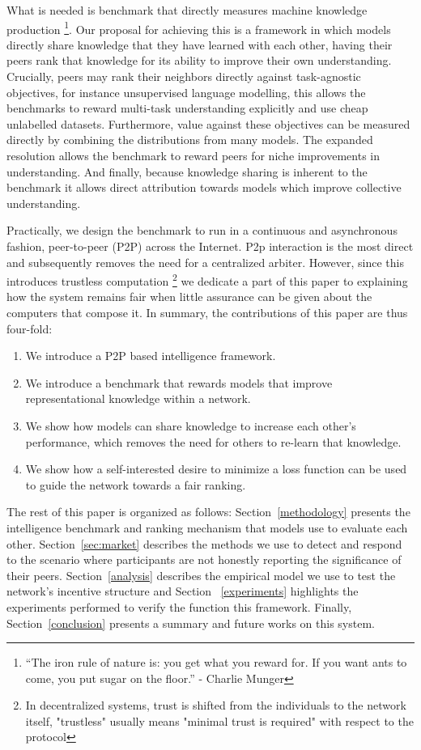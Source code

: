 \documentclass{article}
\begin{document}
What is needed is benchmark that directly measures machine knowledge production \footnote{“The iron rule of nature is: you get what you reward for. If you want ants to come, you put sugar on the floor.” - Charlie Munger}. Our proposal for achieving this is a framework in which models directly share knowledge that they have learned with each other, having their peers rank that knowledge for its ability to improve their own understanding. Crucially, peers may rank their neighbors directly against task-agnostic objectives, for instance unsupervised language modelling, this allows the benchmarks to reward multi-task understanding explicitly and use cheap unlabelled datasets. Furthermore, value against these objectives can be measured directly by combining the distributions from many models. The expanded resolution allows the benchmark to reward peers for niche improvements in understanding. And finally, because knowledge sharing is inherent to the benchmark it allows direct attribution towards models which improve collective understanding. 

Practically, we design the benchmark to run in a continuous and asynchronous fashion, peer-to-peer (P2P) across the Internet. P2p interaction is the most direct and subsequently removes the need for a centralized arbiter. However,  since this introduces trustless computation \footnote{ In decentralized systems, trust is shifted from the individuals to the network itself, "trustless" usually means "minimal trust is required" with respect to the protocol} we dedicate a part of this paper to explaining how the system remains fair when little assurance can be given about the computers that compose it. In summary, the contributions of this paper are thus four-fold:
\begin{enumerate}
	\item We introduce a P2P based intelligence framework.
	\item We introduce a benchmark that rewards models that improve representational knowledge within a network.
	\item We show how models can share knowledge to increase each other's performance, which removes the need for others to re-learn that knowledge. 
	\item We show how a self-interested desire to minimize a loss function can be used to guide the network towards a fair ranking.
\end{enumerate}

The rest of this paper is organized as follows: Section~\ref{methodology} presents the intelligence benchmark and ranking mechanism that models use to evaluate each other. Section~\ref{sec:market} describes the methods we use to detect and respond to the scenario where participants are not honestly reporting the significance of their peers. Section~\ref{analysis} describes the empirical model we use to test the network's incentive structure and Section ~\ref{experiments} highlights the experiments performed to verify the function this framework. Finally, Section~\ref{conclusion} presents a summary and future works on this system.
\end{document}
